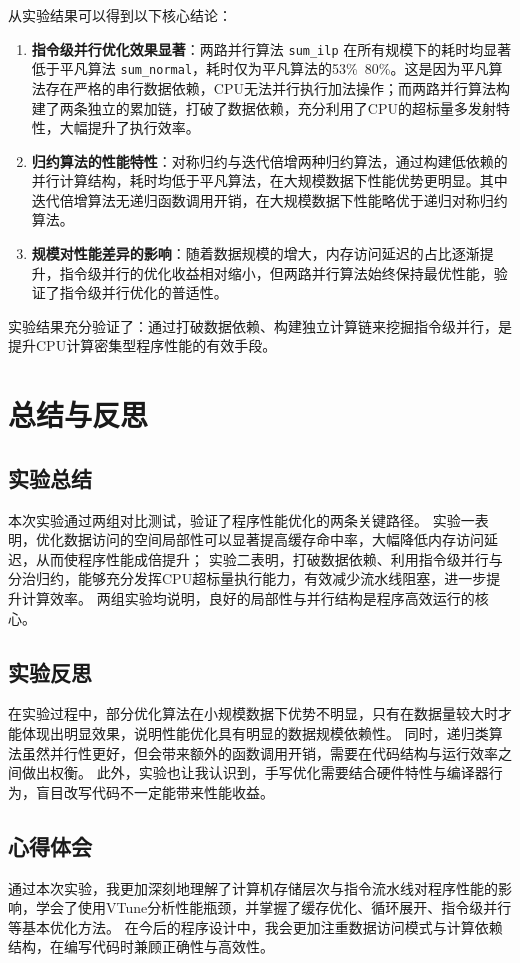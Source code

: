 \documentclass[a4paper]{article}
\begin{document}
从实验结果可以得到以下核心结论：
\begin{enumerate}
    \item \textbf{指令级并行优化效果显著}：两路并行算法 \texttt{sum\_ilp} 在所有规模下的耗时均显著低于平凡算法 \texttt{sum\_normal}，耗时仅为平凡算法的53\%~80\%。这是因为平凡算法存在严格的串行数据依赖，CPU无法并行执行加法操作；而两路并行算法构建了两条独立的累加链，打破了数据依赖，充分利用了CPU的超标量多发射特性，大幅提升了执行效率。
    \item \textbf{归约算法的性能特性}：对称归约与迭代倍增两种归约算法，通过构建低依赖的并行计算结构，耗时均低于平凡算法，在大规模数据下性能优势更明显。其中迭代倍增算法无递归函数调用开销，在大规模数据下性能略优于递归对称归约算法。
    \item \textbf{规模对性能差异的影响}：随着数据规模的增大，内存访问延迟的占比逐渐提升，指令级并行的优化收益相对缩小，但两路并行算法始终保持最优性能，验证了指令级并行优化的普适性。
\end{enumerate}

实验结果充分验证了：通过打破数据依赖、构建独立计算链来挖掘指令级并行，是提升CPU计算密集型程序性能的有效手段。

\section{总结与反思}

\subsection{实验总结}
本次实验通过两组对比测试，验证了程序性能优化的两条关键路径。
实验一表明，优化数据访问的空间局部性可以显著提高缓存命中率，大幅降低内存访问延迟，从而使程序性能成倍提升；
实验二表明，打破数据依赖、利用指令级并行与分治归约，能够充分发挥CPU超标量执行能力，有效减少流水线阻塞，进一步提升计算效率。
两组实验均说明，良好的局部性与并行结构是程序高效运行的核心。

\subsection{实验反思}
在实验过程中，部分优化算法在小规模数据下优势不明显，只有在数据量较大时才能体现出明显效果，说明性能优化具有明显的数据规模依赖性。
同时，递归类算法虽然并行性更好，但会带来额外的函数调用开销，需要在代码结构与运行效率之间做出权衡。
此外，实验也让我认识到，手写优化需要结合硬件特性与编译器行为，盲目改写代码不一定能带来性能收益。

\subsection{心得体会}
通过本次实验，我更加深刻地理解了计算机存储层次与指令流水线对程序性能的影响，学会了使用VTune分析性能瓶颈，并掌握了缓存优化、循环展开、指令级并行等基本优化方法。
在今后的程序设计中，我会更加注重数据访问模式与计算依赖结构，在编写代码时兼顾正确性与高效性。
\end{document}
